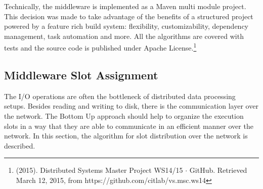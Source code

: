 Technically, the middleware is implemented as a Maven multi module project. This decision was made
to take advantage of the benefits of a structured project powered by a feature rich build system:
flexibility, customizability, dependency management, task automation and more. All the algorithms
are covered with tests and the source code is published under Apache License.\footnote{(2015).
Distributed Systems Master Project WS14/15 $\cdot$ GitHub. Retrieved March 12, 2015, from
https://github.com/citlab/vs.msc.ws14}

\subsection{Middleware Slot Assignment}
\label{sec:middleware_slot_assignment}
The I/O operations are often the bottleneck of distributed data processing setups\cite{cheating}. Besides
reading and writing to disk, there is the communication layer over the network. The Bottom Up
approach should help to organize the execution slots in a way that they are able to communicate in an
efficient manner over the network. In this section, the algorithm for  slot distribution over the
network is described.

